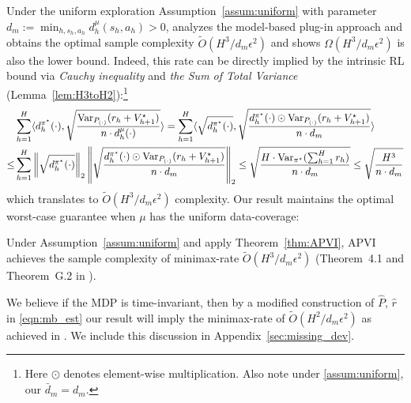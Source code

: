 Under the uniform exploration Assumption~\ref{assum:uniform} with parameter $d_m:=\min_{h,s_h,a_h} d_h^\mu (s_h,a_h) > 0$, \cite{yin2021near} analyzes the model-based plug-in approach and obtains the optimal sample complexity $\widetilde{O}(H^3/d_m\epsilon^2)$ and shows $\Omega(H^3/d_m\epsilon^2)$ is also the lower bound. Indeed, this rate can be directly implied by the intrinsic RL bound via \emph{Cauchy inequality} and \emph{the Sum of Total Variance} (Lemma~\ref{lem:H3toH2}):\footnote{Here $\odot$ denotes element-wise multiplication. Also note under \ref{assum:uniform}, our $\bar{d}_m=d_m$.}
{\small
\begin{equation}\label{eqn:inter_derivation}
\begin{aligned}
&\sum_{h=1}^H\langle d^{\pi^\star}_h(\cdot),\sqrt{\frac{\mathrm{Var}_{P_{(\cdot)}}(r_h+V^\star_{h+1})}{ n\cdot d^\mu_h{(\cdot)}}}\rangle = \sum_{h=1}^H\langle \sqrt{d^{\pi^\star}_h(\cdot)},\sqrt{\frac{d^{\pi^\star}_h(\cdot)\odot\mathrm{Var}_{P_{(\cdot)}}(r_h+V^\star_{h+1})}{ n\cdot d_m}}\rangle\\
\leq &\sum_{h=1}^H\left\lVert \sqrt{d^{\pi^\star}_h(\cdot)}\right\rVert_2\left\lVert\sqrt{\frac{d^{\pi^\star}_h(\cdot)\odot\mathrm{Var}_{P_{(\cdot)}}(r_h+V^\star_{h+1})}{ n\cdot d_m}}\right\rVert_2\leq \sqrt{\frac{H\cdot \mathrm{Var}_{\pi^\star}(\sum_{h=1}^{H} r_{h})}{n\cdot d_m}}\leq \sqrt{\frac{H^3}{n\cdot d_m}}
\end{aligned}
\end{equation}
}which translates to $\widetilde{O}(H^3/d_m\epsilon^2)$  complexity. Our result maintains the optimal worst-case guarantee when $\mu$ has the uniform data-coverage:

\begin{proposition}
	Under Assumption~\ref{assum:uniform} and apply Theorem~\ref{thm:APVI}, APVI achieves the sample complexity of minimax-rate $\widetilde{O}(H^3/d_m\epsilon^2)$ (Theorem~4.1 and Theorem~G.2 in \cite{yin2021near}).
\end{proposition}

\begin{remark}\label{remark:time-variant}
	We believe if the MDP is time-invariant, then by a modified construction of $\widehat{P}$, $\widehat{r}$ in \eqref{eqn:mb_est} our result will imply the minimax-rate of $\widetilde{O}(H^2/d_m\epsilon^2)$ as achieved in \cite{yin2021nearoptimal}. We include this discussion in Appendix~\ref{sec:missing_dev}.
\end{remark}


